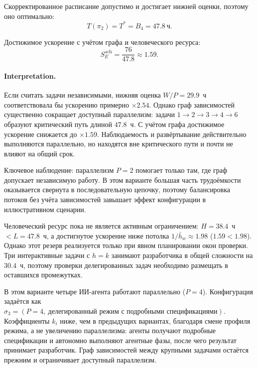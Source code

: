 \documentclass[12pt,a4paper]{article}
\theoremstyle{definition}
\begin{document}
Скорректированное расписание допустимо и достигает нижней оценки, поэтому оно
оптимально:
\[
  T(\pi_2)=T^{*}=B_4=47.8~\text{ч}.
\]

Достижимое ускорение с учётом графа и человеческого ресурса:
\[
  S_E^{\text{ach}} = \frac{76}{47.8} \approx 1.59.
\]

\paragraph{Interpretation.}
Если считать задачи независимыми, нижняя оценка $W/P=29.9$~ч соответствовала бы ускорению примерно $\times 2.54$. Однако граф зависимостей существенно сокращает доступный параллелизм: задачи $1 \to 2 \to 3 \to 4 \to 6$ образуют критический путь длиной $47.8$~ч. С учётом графа достижимое ускорение снижается до $\times 1.59$. Наблюдаемость и развёртывание действительно выполняются параллельно, но находятся вне критического пути и почти не влияют на общий срок.

Ключевое наблюдение: параллелизм $P = 2$ помогает только там, где граф допускает независимую работу. В этом варианте большая часть трудоёмкости оказывается свернута в последовательную цепочку, поэтому балансировка потоков без учёта зависимостей завышает эффект конфигурации в иллюстративном сценарии.

Человеческий ресурс пока не является активным ограничением: $H = 38.4$~ч $< L = 47.8$~ч, а достигнутое ускорение ниже потолка $1/\bar{h}_w \approx 1.98$ ($1.59 < 1.98$). Однако этот резерв реализуется только при явном планировании окон проверки. Три интерактивные задачи с $h = k$ занимают разработчика в общей сложности на $30.4$~ч, поэтому проверки делегированных задач необходимо размещать в оставшихся промежутках.


В этом варианте четыре ИИ-агента работают параллельно ($P = 4$). Конфигурация задаётся как $\sigma_3 = (P{=}4,\ \text{делегированный режим с подробными спецификациями})$. Коэффициенты $k_i$ ниже, чем в предыдущих вариантах, благодаря смене профиля режима, а не увеличению параллелизма: агенты получают подробные спецификации и автономно выполняют агентные фазы, после чего результат принимает разработчик. Граф зависимостей между крупными задачами остаётся прежним и ограничивает доступный параллелизм.
\end{document}
